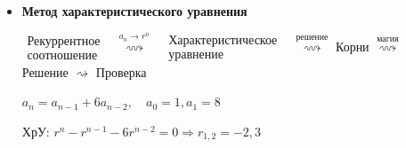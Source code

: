 \documentclass[12pt]{article}
\begin{document}
\begin{itemize}
        Решить рекуррентное соотношение $a_n = 3a_{n-1} - 2a_{n-1}$, где $a_0 = 1, a_1 = 3$

        Используем производящие функции:

        \setlength{\tabcolsep}{2pt}
        \begin{tabular}{cccrcrcccll}
            $A(x) = $ & $a_0$ & $+$ & $a_1 x$ & $+$ & $a_2 x^2$    & $+$ & $a_3 x^3$ & $+$ & $\dots$  &  $ = A(x)$                  \\ \hline
             &       &     &         &     & $3x(a_1 x$   & $+$ & $a_2 x^2$ & $+$ & $\dots)$ & $= 3x(A(x) - a_0)$ \\
                   &       &     &         &     & $-2x^2(a_0 $ & $+$ & $a_1 x$   & $+$ & $\dots)$ & $= -2x^2 A(x)$     \\
                   & $a_0$ & $+$ & $a_1 x$ &     &              &     &           &     &          & $= a_0 + a_1 x$
        \end{tabular}

        $A(x) = a_0 + a_1 x + 3x(A(x) - a_0) - 2x^2 A(x) = 1 + 3x + 3xA(x) - 3x - 2x^2 A(x)$

        $A(x) (2x^2 - 3x + 1) = 1 \Longrightarrow A(x) = \frac{1}{1 - 3x + 2x^2} = \frac{-1}{1 - x} + \frac{2}{1 - 2x} \Longrightarrow a_n = 2^{n + 1} - 1$


        \item \textbf{Метод характеристического уравнения}

        $\substack{\text{Рекуррентное} \\ \text{соотношение}}$ \ $\stackrel{a_n \to r^n}{\rightsquigarrow}$ \ $\substack{\text{Характеристическое} \\ \text{уравнение}}$ \ $\stackrel{\text{решение}}{\rightsquigarrow}$ Корни $\stackrel{\text{магия}}{\rightsquigarrow}$ Решение $\rightsquigarrow$ Проверка

        \vspace{3mm}

        \Exs $a_n = a_{n - 1} + 6a_{n - 2}, \quad a_0 = 1, a_1 = 8$

        ХрУ: $r^n - r^{n - 1} - 6r^{n - 2} = 0 \Longrightarrow r_{1,2} = -2, 3$



\end{itemize}
\end{document}
